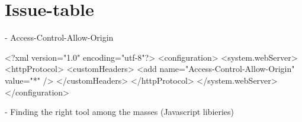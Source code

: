 \section{Issue-table}


- Access-Control-Allow-Origin

<?xml version="1.0" encoding="utf-8"?>
<configuration>
 <system.webServer>
   <httpProtocol>
     <customHeaders>
       <add name="Access-Control-Allow-Origin" value="*" />
     </customHeaders>
   </httpProtocol>
 </system.webServer>
</configuration>



- Finding the right tool among the masses (Javascript libieries)
